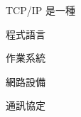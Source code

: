 \ifx\ntpcNinetyThree\undefined[93學年基北區] \fi
TCP/IP 是一種
  \begin{optionlist}
  \item 程式語言
  \item 作業系統
  \item 網路設備
  \item 通訊協定\label{ntpc-93-a26}
  \end{optionlist}
